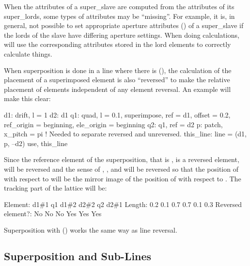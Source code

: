 When the attributes of a super_slave are computed from the attributes of its super_lords, some types
of attributes may be ``missing''. For example, it is, in general, not possible to set appropriate
aperture attributes () of a super_slave if the lords of the slave have differing
aperture settings. When doing calculations, \bmad will use the corresponding attributes stored in
the lord elements to correctly calculate things.

When superposition is done in a line where there is  (),
the calculation of the placement of a superimposed element is also ``reversed'' to make the relative
placement of elements independent of any element reversal.  An example will make this clear:
\begin{example}
  d1: drift, l = 1
  d2: d1
  q1: quad, l = 0.1, superimpose, ref = d1, offset = 0.2, 
             ref_origin = beginning, ele_origin = beginning
  q2: q1, ref = d2
  p: patch, x_pitch = pi  ! Needed to separate reversed and unreversed.
  this_line: line = (d1, p, --d2)
  use, this_line
\end{example}
Since the reference element of the  superposition, that is , is a reversed element,
 will be reversed and the sense of , , and  will be
reversed so that the position of  with respect to  will be the mirror image of the
position of  with respect to . The tracking part of the lattice will be:
\begin{example}
  Element:           d1{\#}1    q1  d1{\#}2   d2{\#}2    q2   d2{\#}1
  Length:             0.2   0.1   0.7    0.7   0.1    0.3
  Reversed element?:   No    No    No    Yes   Yes    Yes
\end{example}

Superposition with  () works the same way as line reversal.

\subsection{Superposition and Sub-Lines}
\label{s:super.sub.line}

